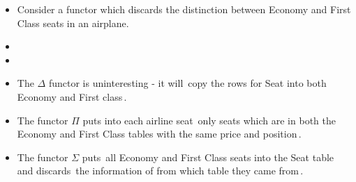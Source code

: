 
\begin{itemize}
    \item Consider a functor which discards the distinction between Economy and First Class seats in an airplane.
    \item {}
    \item {}
    \item The $\Delta$ functor is uninteresting - it will \,copy the rows for Seat into both Economy and First class\,.
    \item The functor $\Pi$ puts into each airline seat \,only seats which are in both the Economy and First Class tables with the same price and position\,.
    \item The functor $\Sigma$ puts \,all Economy and First Class seats into the Seat table\, and discards \,the information of from which table they came from\,.
  \end{itemize}
